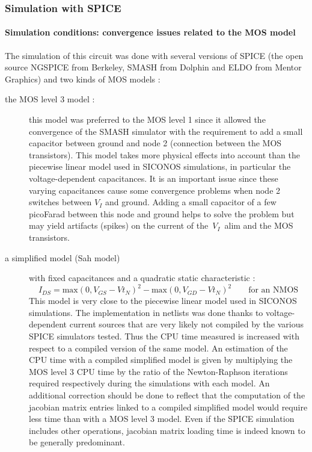 \documentclass{article}
\begin{document}
\subsubsection{Simulation with SPICE }
\paragraph{Simulation conditions: convergence issues related to the MOS model}
The simulation of this circuit was done with several versions of SPICE (the open source NGSPICE from Berkeley, SMASH from Dolphin and
ELDO from Mentor Graphics) and two kinds of MOS models :
\begin{description}
\item[the MOS level 3 model :] this model was preferred to the MOS level 1 since it allowed the convergence
of the SMASH simulator with the requirement to add a small capacitor between ground and node 2 (connection between
the MOS transistors). This model takes more physical effects into account than the piecewise linear model used in SICONOS simulations,
in particular the voltage-dependent capacitances. It is an important issue since these varying capacitances
cause some convergence problems when node 2 switches between $V_I$ and ground.
Adding a small capacitor of a few picoFarad between this node and ground helps to solve the problem
but may yield artifacts (spikes) on the current of the~$V_I$~alim and the MOS transistors.
\item[a simplified model (Sah model)] with fixed capacitances and a quadratic static characteristic :
\[
I_{DS} = \textrm{max}(0,V_{GS}-Vt_N)^2 - \textrm{max}(0,V_{GD}-Vt_N)^2 \qquad \textrm{for an NMOS}
\]
This model is very close to the piecewise linear model used in SICONOS simulations. The implementation in netlists was done thanks to 
voltage-dependent current sources that are very likely not compiled by the various SPICE simulators tested.
Thus the CPU time measured is increased with respect to a compiled version of the same model.
An estimation of the CPU time with a compiled simplified model is given by multiplying the MOS level 3 CPU time
by the ratio of the Newton-Raphson iterations required respectively during the simulations with each model.
An additional correction should be done to reflect that the computation of the jacobian matrix entries
linked to a compiled simplified model would require less time than with a MOS level 3 model. Even if the SPICE simulation
includes other operations, jacobian matrix loading time is indeed known to be generally predominant.
\end{description}
\end{document}
